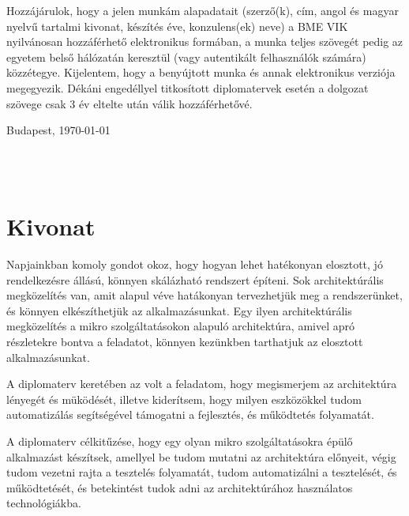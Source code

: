 \documentclass[11pt,magyar,a4paper,oneside,]{report}
\begin{document}
Hozzájárulok, hogy a jelen munkám alapadatait (szerző(k), cím, angol és magyar nyelvű tartalmi kivonat, készítés éve, konzulens(ek) neve) a BME VIK nyilvánosan hozzáférhető elektronikus formában, a munka teljes szövegét pedig az egyetem belső hálózatán keresztül (vagy autentikált felhasználók számára) közzétegye. Kijelentem, hogy a benyújtott munka és annak elektronikus verziója megegyezik. Dékáni engedéllyel titkosított diplomatervek esetén a dolgozat szövege csak 3 év eltelte után válik hozzáférhetővé.

\begin{flushleft}
\vspace*{1cm}
Budapest, \today
\end{flushleft}

\begin{flushright}
 \vspace*{1cm}
 \makebox[7cm]{\rule{6cm}{.4pt}}\\
 \\
\end{flushright}
\thispagestyle{empty}

\vfill
\clearpage
\thispagestyle{empty} %

\chapter*{Kivonat}\label{kivonat}

Napjainkban komoly gondot okoz, hogy hogyan lehet hatékonyan elosztott,
jó rendelkezésre állású, könnyen skálázható rendszert építeni. Sok
architektúrális megközelítés van, amit alapul véve hatákonyan
tervezhetjük meg a rendszerünket, és könnyen elkészíthetjük az
alkalmazásunkat. Egy ilyen architektúrális megközelítés a mikro
szolgáltatásokon alapuló architektúra, amivel apró részletekre bontva a
feladatot, könnyen kezünkben tarthatjuk az elosztott alkalmazásunkat.

A diplomaterv keretében az volt a feladatom, hogy megismerjem az
architektúra lényegét és müködését, illetve kiderítsem, hogy milyen
eszközökkel tudom automatizálás segítségével támogatni a fejlesztés, és
működtetés folyamatát.

A diplomaterv célkitűzése, hogy egy olyan mikro szolgáltatásokra épülő
alkalmazást készítsek, amellyel be tudom mutatni az architektúra
előnyeit, végig tudom vezetni rajta a tesztelés folyamatát, tudom
automatizálni a tesztelését, és működtetését, és betekintést tudok adni
az architektúrához használatos technológiákba.
\end{document}
